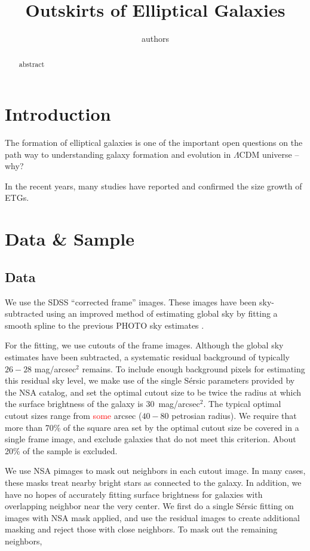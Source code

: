 \documentclass{aastex}
\newcommand{\Sersic}{S\'ersic}
\newcommand\todo[1]{\textcolor{red}{#1}}
\begin{document}
\title{Outskirts of Elliptical Galaxies}
\author{authors}


\begin{abstract}
    abstract    
\end{abstract}    


\section{Introduction}
The formation of elliptical galaxies is one of the important open questions on the path way to
understanding galaxy formation and evolution in $\Lambda$CDM universe -- why?

In the recent years, many studies have reported and confirmed the size growth of ETGs.

\section{Data \& Sample}

\subsection{Data}
We use the SDSS ``corrected frame'' images. These images have been sky-subtracted using an improved
method of estimating global sky by fitting a smooth spline to the previous PHOTO sky estimates
\citep[see][for details]{blanton2011}.

For the fitting, we use cutouts of the frame images. Although the global sky estimates have been subtracted,
a systematic residual background of typically $26-28$ mag/arcsec$^2$ remains.
To include enough background pixels for estimating this residual sky level, we make use of the single \Sersic{}
parameters provided by the NSA catalog,
and set the optimal cutout size to be twice the radius at which the surface
brightness of the galaxy is 30~mag/arcsec$^2$.
The typical optimal cutout sizes range from \todo{some} arcsec ($40-80$ petrosian radius).
We require that more than 70\% of the square area set by the optimal cutout size be covered in a single frame image,
and exclude galaxies that do not meet this criterion.
About 20\% of the sample is excluded.

We use NSA pimages to mask out neighbors in each cutout image. In many cases, these masks treat nearby bright
stars as connected to the galaxy.
In addition, we have no hopes of accurately fitting surface brightness for galaxies with overlapping neighbor
near the very center.
We first do a single \Sersic{} fitting on images with NSA mask applied, and use the residual images to create
additional masking and reject those with close neighbors.
To mask out the remaining neighbors, 
\end{document}
